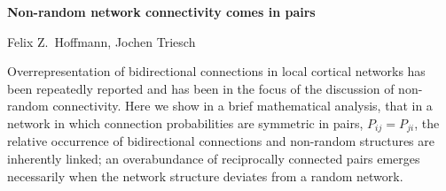 \documentclass[paper=a4]{scrartcl}
\begin{document}
\begin{center}
{\Large{\textbf{ Non-random network connectivity comes in pairs }}}

\end{center}
\centerline{}
\centerline{Felix Z.~Hoffmann, Jochen Triesch}

\vspace{1cm}

Overrepresentation of bidirectional connections in local cortical networks has been repeatedly reported and has been in the focus of the discussion of non-random connectivity. Here we show in a brief mathematical analysis, that in a network in which connection probabilities are symmetric in pairs, $P_{ij} = P_{ji}$, the relative occurrence of bidirectional connections and non-random structures are inherently linked; an overabundance of reciprocally connected pairs emerges necessarily when the network structure deviates from a random network.
\end{document}
